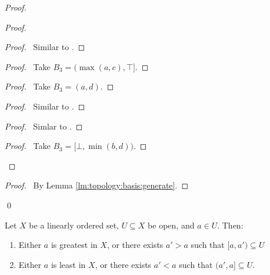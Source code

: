 \begin{proof}
\begin{proof}
\begin{proof}
      \pf\ Similar to .
    \end{proof}
    \step{<2>6}{\case{$B_1 = (a, \top], B_2 = (c, \top]$}}
    \begin{proof}
      \pf\ Take $B_3 = (\max(a, c), \top]$.
    \end{proof}
    \step{<2>7}{\case{$B_1 = (a, \top], B_2 = [\bot, d)$}}
    \begin{proof}
      \pf\ Take $B_3 = (a, d)$.
    \end{proof}
    \step{<2>8}{\case{$B_1 = [\bot, b), B_2 = (c, d)$}}
    \begin{proof}
      \pf\ Similar to .
    \end{proof}
    \begin{proof}
      \pf\ Simlar to .
    \end{proof}
    \step{<2>10}{\case{$B_1 = [\bot, b), B_2 = [\bot, d)$}}
    \begin{proof}
      \pf\ Take $B_3 = [\bot, \min(b, d))$.
    \end{proof}
  \end{proof}
  \qedstep
  \begin{proof}
    \pf\ By Lemma \ref{lm:topology:basis:generate}.
  \end{proof}
  \qed
\end{proof}

    \begin{lm}
  \label{lm:topology:order:open}
  Let $X$ be a linearly ordered set, $U \subseteq X$ be open, and $a \in U$.
  Then:
  \begin{enumerate}
    \item Either $a$ is greatest in $X$, or there exists $a' > a$ such that
    $[a,
    a') \subseteq U$
    \item Either $a$ is least in $X$, or there exists $a' < a$ such that
    $(a',
    a]
    \subseteq U$.
  \end{enumerate}
\end{lm}

